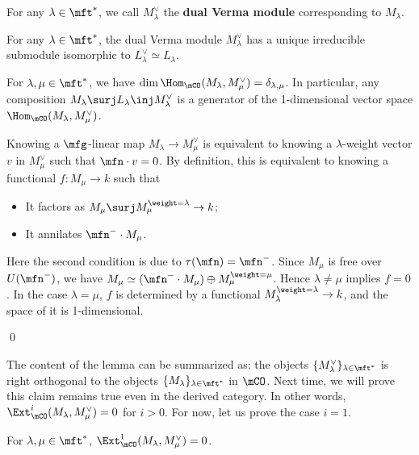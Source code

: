	

	\begin{defn}
		For any $\lambda\in \mft^*$, we call $M_\lambda^\vee$ the \textbf{dual Verma module} corresponding to $M_\lambda$.
	\end{defn}

	\begin{cor}
		For any $\lambda\in \mft^*$, the dual Verma module $M_\lambda^\vee$ has a unique irreducible submodule isomorphic to $L_\lambda^\vee \simeq L_\lambda$.
	\end{cor}

	\begin{lem}
		For $\lambda,\mu\in \mft^*$, we have $\dim \Hom_\mCO(M_\lambda,M_\mu^\vee) = \delta_{\lambda,\mu}$. In particular, any composition $M_\lambda \surj L_\lambda \inj M_\lambda^\vee$ is a generator of the 1-dimensional vector space $\Hom_\mCO(M_\lambda,M_\mu^\vee)$.
	\end{lem}

	\proof
		Knowing a $\mfg$-linear map $M_\lambda \to M_\mu^\vee$ is equivalent to knowing a $\lambda$-weight vector $v$ in $M_\mu^\vee$ such that $\mfn\cdot v=0$. By definition, this is equivalent to knowing a functional $f: M_\mu \to k$ such that
		\begin{itemize}
			\item 
				It factors as $M_\mu \surj M_\mu^{\weight = \lambda} \to k$;
			\item
				It annilates $\mfn^-\cdot M_\mu$.
		\end{itemize}
		Here the second condition is due to $\tau(\mfn)=\mfn^-$. Since $M_\mu$ is free over $U(\mfn^-)$, we have $M_\mu \simeq (\mfn^-\cdot M_\mu) \oplus M_\mu^{\weight = \mu}$. Hence $\lambda\neq \mu$ implies $f=0$. In the case $\lambda = \mu$, $f$ is determined by a functional $M_\lambda^{\weight = \lambda} \to k$, and the space of it is 1-dimensional.

	\qed

	\begin{rem}
		The content of the lemma can be summarized as: the objects $\{M_\lambda^\vee\}_{\lambda\in \mft^*}$ is right orthogonal to the objects $\{M_\lambda\}_{\lambda\in \mft^*}$ in $\mCO$. Next time, we will prove this claim remains true even in the derived category. In other words, $\Ext^i_\mCO(M_\lambda,M_\mu^\vee) =0$ for $i>0$. For now, let us prove the case $i=1$.

	\end{rem}

	\begin{lem}
		For $\lambda,\mu\in \mft^*$, $\Ext^1_\mCO(M_\lambda,M_\mu^\vee) =0$.
	\end{lem}

